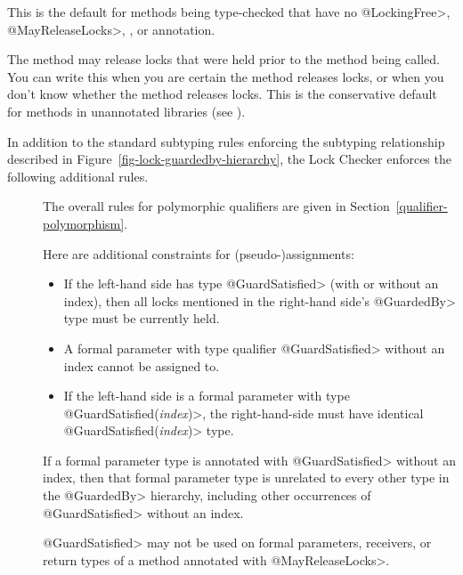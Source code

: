 \begin{sloppypar}
\begin{description}
  This is the default for methods being type-checked that have no \<@LockingFree>,
  \<@MayReleaseLocks>, , or 
  annotation.

\item[\refqualclass{checker/lock/qual}{MayReleaseLocks}]
  The method may release locks that were held prior to the method being called.
  You can write this when you are certain the method releases locks, or
  when you don't know whether the method releases locks.
  This is the conservative default for methods in unannotated libraries (see ).

\end{description}
\end{sloppypar}



In addition to the standard subtyping rules enforcing the subtyping relationship
described in Figure~\ref{fig-lock-guardedby-hierarchy}, the Lock Checker enforces
the following additional rules.



\begin{description}

\item[]

  The overall rules for polymorphic qualifiers are given in
  Section~\ref{qualifier-polymorphism}.

  Here are additional constraints for (pseudo-)assignments:

  \begin{itemize}
  \item
    If the left-hand side has type \<@GuardSatisfied> (with or without an index),
    then all locks mentioned in the right-hand side's \<@GuardedBy> type
    must be currently held.
  \item
    A formal parameter with type qualifier \<@GuardSatisfied> without an
    index cannot be assigned to.
  \item
    If the left-hand side is a formal parameter with type
    \<@GuardSatisfied(\emph{index})>, the right-hand-side must have
    identical \<@GuardSatisfied(\emph{index})> type.
  \end{itemize}

  If a formal parameter type is
  annotated with \<@GuardSatisfied> without an index, then that formal parameter
  type is unrelated to every other type in the \<@GuardedBy> hierarchy,
  including other occurrences of \<@GuardSatisfied> without an index.

  \<@GuardSatisfied> may not be used on formal parameters, receivers, or
  return types of a method annotated with \<@MayReleaseLocks>.
\end{description}


